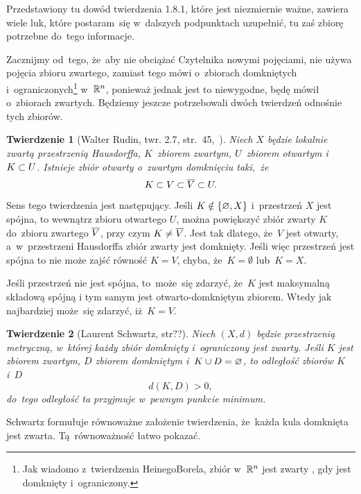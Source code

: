 \documentclass[a4paper,11pt]{article}
\newtheorem{twr}{Twierdzenie} %
\begin{document}
\vspace{\spaceFour}


\start {} Przedstawiony tu dowód twierdzenia 1.8.1, które
jest niezmiernie ważne, zawiera wiele luk, które postaram~się
w~dalszych podpunktach uzupełnić, tu zaś zbiorę potrzebne do~tego
informacje.

Zacznijmy od~tego, że~aby nie obciążać Czytelnika nowymi pojęciami,
nie używa pojęcia zbioru zwartego, zamiast tego mówi o~zbiorach
domkniętych i~ograniczonych\footnote{Jak wiadomo z~twierdzenia
  Heinego\dywiz Borela, zbiór w~$\mathbb{ R }^{ n }$ jest zwarty \wtw, gdy jest
  domknięty i~ograniczony.} w~$\mathbb{ R }^{ n }$, ponieważ jednak jest to
niewygodne, będę mówił o~zbiorach zwartych. Będziemy jeszcze
potrzebowali dwóch twierdzeń odnośnie tych zbiorów.

\begin{twr}[Walter Rudin, twr. 2.7, str.~45,~\cite{Rudin98}]
  \label{twr:Zem-s01-01}
  Niech $X$ będzie lokalnie zwartą przestrzenią Hausdorffa,
  $K$~zbiorem zwartym, $U$~zbiorem otwartym i~$K \subset U$. Istnieje
  zbiór otwarty o~zwartym domknięciu taki,~że
  \begin{equation}
    \label{eq:Zem-s01-04}
    K \subset V \subset \overline{ V } \subset U.
  \end{equation}
\end{twr}
Sens tego twierdzenia jest następujący. Jeśli $K \notin \{ \varnothing, X \}$
i~przestrzeń $X$ jest spójna, to wewnątrz zbioru otwartego $U$, można
powiększyć zbiór zwarty $K$ do~zbioru zwartego $\overline{ V }$, przy czym
$K \neq \overline{ V }$. Jest tak dlatego, że~$V$ jest otwarty,
a~w~przestrzeni Hausdorffa zbiór zwarty jest domknięty. Jeśli więc
przestrzeń jest spójna to nie może zajść równość $K = V$, chyba,
że~$K = \emptyset$ lub~$K = X$.

Jeśli przestrzeń nie jest spójna, to~może~się zdarzyć, że~$K$ jest
maksymalną składową spójną i tym samym jest otwarto-domkniętym
zbiorem. Wtedy jak najbardziej może~się zdarzyć, iż~$K = V$.

\begin{twr}[Laurent Schwartz, str??\cite{Schwartz79}]
  \label{twr:Zem-s01-02}
  Niech $( X, d )$ będzie przestrzenią metryczną, w~której każdy zbiór
  domknięty i~ograniczony jest zwarty. Jeśli $K$ jest zbiorem zwartym,
  $D$ zbiorem domkniętym i~$K \cup D = \varnothing$, to odległość zbiorów $K$
  i~$D$
  \begin{equation}
    \label{eq:Zem-s01-05}
    d( K, D ) > 0,
  \end{equation}
  do~tego odległość ta przyjmuje w~pewnym punkcie minimum.
\end{twr}
\noi Schwartz formułuje równoważne założenie twierdzenia, że~każda
kula domknięta jest zwarta. Tą~równoważność łatwo pokazać.
\end{document}
